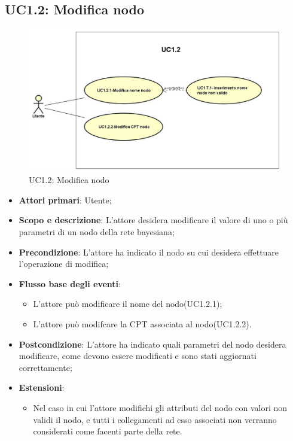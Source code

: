 \subsection{UC1.2: Modifica nodo} 
\hypertarget{UC1.2}{} 
\begin{figure} [H]
	\centering
	\includegraphics[scale=0.45]{Img/UC1-2} 
	\caption{UC1.2: Modifica nodo} \label{} 
\end{figure} 
\begin{itemize} 
	\item{\textbf{Attori primari}: Utente;} 
	\item{\textbf{Scopo e descrizione}: L'attore desidera modificare il valore di uno o più parametri di un nodo della rete bayesiana;} 
	\item{\textbf{Precondizione}: L'attore ha indicato il nodo su cui desidera effettuare l'operazione di modifica;} 
	\item{\textbf{Flusso base degli eventi}: } 
	\begin{itemize} 
		\item{L'attore può modificare il nome del nodo(UC1.2.1);} 
		\item{L'attore può modifcare la CPT associata al nodo(UC1.2.2).} 		
	\end{itemize} 
	\item{\textbf{Postcondizione}: L'attore ha indicato quali parametri del nodo desidera modificare, come devono essere modificati e sono stati aggiornati correttamente;} 
	\item{\textbf{Estensioni}:} 
	\begin{itemize} 
		\item{Nel caso in cui l'attore modifichi gli attributi del nodo con valori non validi il nodo, e tutti i collegamenti ad esso associati non verranno considerati come facenti parte della rete.} 
	\end{itemize} 
\end{itemize} 
